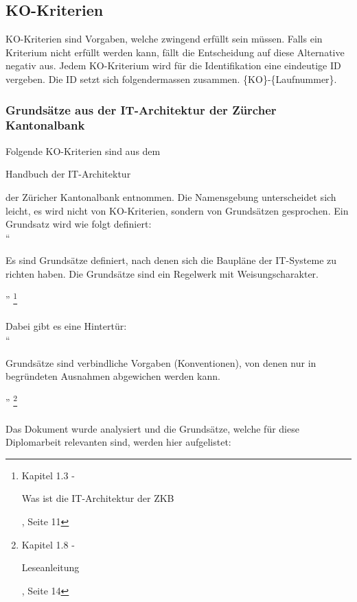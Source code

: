 \documentclass[
11pt, %
a4paper, %
BCOR25mm, %
DIV14, %
footsepline = false, %
headsepline, %
twoside, %
openright,
abstracton, %
listof=totocnumbered, %
bibliography=totocnumbered %
]{scrreprt}
\begin{document}
  \subsection{KO-Kriterien}
  
  KO-Kriterien sind Vorgaben, welche zwingend erfüllt sein müssen. Falls ein
  Kriterium nicht erfüllt werden kann, fällt die Entscheidung auf diese
  Alternative negativ aus. Jedem KO-Kriterium wird für die Identifikation eine
  eindeutige ID vergeben. Die ID setzt sich folgendermassen zusammen.
  \{KO\}-\{Laufnummer\}.
  
  \subsubsection{Grundsätze aus der IT-Architektur der Zürcher Kantonalbank}
  
  Folgende KO-Kriterien sind aus dem \begin{itshape}Handbuch der
  IT-Architektur\end{itshape}\cite{ZkbHandbuchDerItArchitektur} der Züricher
  Kantonalbank entnommen. Die Namensgebung unterscheidet sich leicht, es wird
  nicht von KO-Kriterien, sondern von Grundsätzen gesprochen. Ein Grundsatz
  wird wie folgt definiert:\\
  
  ``\begin{itshape}Es sind Grundsätze definiert, nach denen sich die Baupläne
  der IT-Systeme zu richten haben. Die Grundsätze sind ein Regelwerk mit
  Weisungscharakter.\end{itshape}''
  \footnote{\cite{ZkbHandbuchDerItArchitektur} Kapitel 1.3 - \begin{itshape}Was
  ist die IT-Architektur der ZKB\end{itshape}, Seite 11}
  \\
  \\
  \noindent
  Dabei gibt es eine Hintertür:\\

  ``\begin{itshape}Grundsätze sind verbindliche Vorgaben (Konventionen), von
  denen nur in begründeten Ausnahmen abgewichen werden kann.\end{itshape}''
  \footnote{\cite{ZkbHandbuchDerItArchitektur} Kapitel 1.8 -
  \begin{itshape}Leseanleitung\end{itshape}, Seite 14}
  \\
  \\
  \noindent
  Das Dokument wurde analysiert und die Grundsätze, welche für diese
  Diplomarbeit relevanten sind, werden hier aufgelistet:
  
\end{document}

